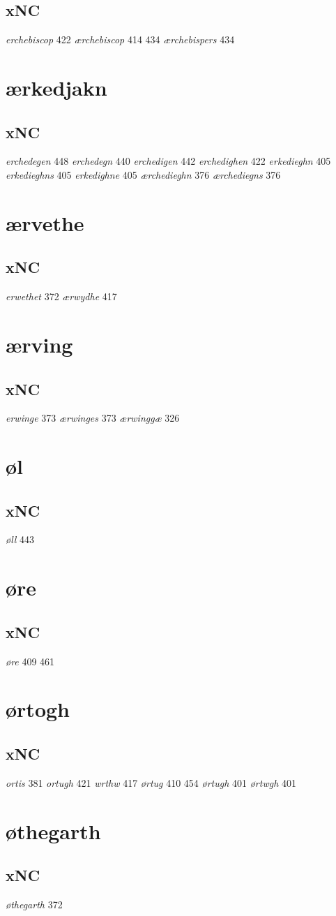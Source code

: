 \documentclass[a4paper,twocolumn]{article}
\begin{document}
\subsection{xNC}
\label{sec:org03c72e5}
\emph{erchebiscop} 422 \emph{ærchebiscop} 414 434 \emph{ærchebispers} 434 
\section{ærkedjakn}
\label{sec:orgfedadad}
\subsection{xNC}
\label{sec:orgbc1a13a}
\emph{erchedegen} 448 \emph{erchedegn} 440 \emph{erchedigen} 442 \emph{erchedighen} 422 \emph{erkedieghn} 405 \emph{erkedieghns} 405 \emph{erkedighne} 405 \emph{ærchedieghn} 376 \emph{ærchediegns} 376 
\section{ærvethe}
\label{sec:orgcb2fd43}
\subsection{xNC}
\label{sec:org5dfbc08}
\emph{erwethet} 372 \emph{ærwydhe} 417 
\section{ærving}
\label{sec:org3d7e566}
\subsection{xNC}
\label{sec:org631a11e}
\emph{erwinge} 373 \emph{ærwinges} 373 \emph{ærwinggæ} 326 
\section{øl}
\label{sec:orgd3922c7}
\subsection{xNC}
\label{sec:org8d32e5b}
\emph{øll} 443 
\section{øre}
\label{sec:org9c91918}
\subsection{xNC}
\label{sec:org74f5711}
\emph{øre} 409 461 
\section{ørtogh}
\label{sec:org93ed840}
\subsection{xNC}
\label{sec:org67202ed}
\emph{ortis} 381 \emph{ortugh} 421 \emph{wrthw} 417 \emph{ørtug} 410 454 \emph{ørtugh} 401 \emph{ørtwgh} 401 
\section{øthegarth}
\label{sec:org96c3971}
\subsection{xNC}
\label{sec:org50646a0}
\emph{øthegarth} 372 
\end{document}
